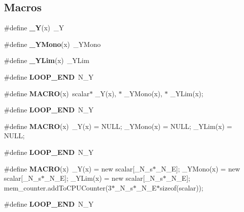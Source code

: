 \subsection*{Macros}
\begin{DoxyCompactItemize}
\item 
\#define {\bfseries \-\_\-\-Y}(x)~\-\_\-\-Y\label{limiting_8h_aa9abd441032a1fe465ba88358228ce9e}

\item 
\#define {\bfseries \-\_\-\-Y\-Mono}(x)~\-\_\-\-Y\-Mono\label{limiting_8h_a819d6809fc09aba4fcb79bcf97a40db0}

\item 
\#define {\bfseries \-\_\-\-Y\-Lim}(x)~\-\_\-\-Y\-Lim\label{limiting_8h_a3f3372245e0ecab1f12ec38242c60cff}

\item 
\#define {\bfseries L\-O\-O\-P\-\_\-\-E\-N\-D}~N\-\_\-\-Y\label{limiting_8h_aa475ffaee4695d0cbfb87c71fc1642eb}

\item 
\#define {\bfseries M\-A\-C\-R\-O}(x)~scalar$\ast$ \-\_\-\-Y(x), $\ast$ \-\_\-\-Y\-Mono(x), $\ast$ \-\_\-\-Y\-Lim(x);\label{limiting_8h_a5de1a5f1c0cf262e0ff2e5f03d586abc}

\item 
\#define {\bfseries L\-O\-O\-P\-\_\-\-E\-N\-D}~N\-\_\-\-Y\label{limiting_8h_aa475ffaee4695d0cbfb87c71fc1642eb}

\item 
\#define {\bfseries M\-A\-C\-R\-O}(x)~\-\_\-\-Y(x) = N\-U\-L\-L; \-\_\-\-Y\-Mono(x) = N\-U\-L\-L; \-\_\-\-Y\-Lim(x) = N\-U\-L\-L;\label{limiting_8h_a5de1a5f1c0cf262e0ff2e5f03d586abc}

\item 
\#define {\bfseries L\-O\-O\-P\-\_\-\-E\-N\-D}~N\-\_\-\-Y\label{limiting_8h_aa475ffaee4695d0cbfb87c71fc1642eb}

\item 
\#define {\bfseries M\-A\-C\-R\-O}(x)~\-\_\-\-Y(x) = new scalar[\-\_\-\-N\-\_\-s$\ast$\-\_\-\-N\-\_\-\-E]; \-\_\-\-Y\-Mono(x) = new scalar[\-\_\-\-N\-\_\-s$\ast$\-\_\-\-N\-\_\-\-E]; \-\_\-\-Y\-Lim(x) = new scalar[\-\_\-\-N\-\_\-s$\ast$\-\_\-\-N\-\_\-\-E]; mem\-\_\-counter.\-add\-To\-C\-P\-U\-Counter(3$\ast$\-\_\-\-N\-\_\-s$\ast$\-\_\-\-N\-\_\-\-E$\ast$sizeof(scalar));\label{limiting_8h_a5de1a5f1c0cf262e0ff2e5f03d586abc}

\item 
\#define {\bfseries L\-O\-O\-P\-\_\-\-E\-N\-D}~N\-\_\-\-Y\label{limiting_8h_aa475ffaee4695d0cbfb87c71fc1642eb}


\end{DoxyCompactItemize}
